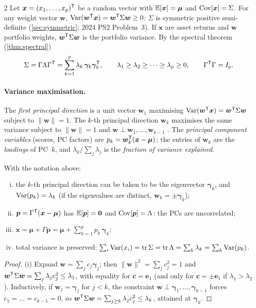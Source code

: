 \begin{paracol}{2}
Let $\bm x=(x_1,\dots,x_p)^{\mathsf T}$ be a random vector with $\mathbb{E}[\bm x]=\bm\mu$ and $\operatorname{Cov}[\bm x]=\Sigma$. For any
weight vector $\bm w$, $\operatorname{Var}(\bm w^{\mathsf T}\bm x)=\bm w^{\mathsf T}\Sigma\bm w\ge0$: $\Sigma$ is symmetric positive semi-definite
(\cref{sec:symmetric}; 2024 PS2 Problem~3). If $\bm x$ are asset returns and $\bm w$ portfolio weights,
$\bm w^{\mathsf T}\Sigma\bm w$ is the portfolio variance. By the spectral theorem (\cref{thm:spectral})
\[
  \Sigma=\Gamma\Lambda\Gamma^{\mathsf T}=\sum_{k=1}^p\lambda_k\,\bm\gamma_k\bm\gamma_k^{\mathsf T},\qquad
  \lambda_1\ge\lambda_2\ge\dots\ge\lambda_p\ge0,\qquad \Gamma^{\mathsf T}\Gamma=I_p .
\]

\paragraph{Variance maximisation.}

\begin{definition}\label{ch07:def-pca}
The \emph{first principal direction} is a unit vector $\bm w_1$ maximising $\operatorname{Var}(\bm w^{\mathsf T}\bm x)=\bm w^{\mathsf T}\Sigma\bm w$
subject to $\|\bm w\|=1$. The $k$-th principal direction $\bm w_k$ maximises the same variance subject to
$\|\bm w\|=1$ and $\bm w\perp\bm w_1,\dots,\bm w_{k-1}$ . The \emph{principal component
variables} (scores, PC factors) are $p_k=\bm w_k^{\mathsf T}(\bm x-\bm\mu)$; the entries of $\bm w_k$ are the
\emph{loadings} of PC~$k$, and $\lambda_k/\sum_j\lambda_j$ is the \emph{fraction of variance explained}.
\end{definition}

\begin{theorem}\label{ch07:thm-pca}
With the notation above:
\begin{enumerate}[(i)]
  \item the $k$-th principal direction can be taken to be the eigenvector $\bm\gamma_k$, and
        $\operatorname{Var}(p_k)=\lambda_k$ (if the eigenvalues are distinct, $\bm w_k=\pm\bm\gamma_k$);
  \item $\bm p=\Gamma^{\mathsf T}(\bm x-\bm\mu)$ has $\mathbb{E}[\bm p]=\bm 0$ and $\operatorname{Cov}[\bm p]=\Lambda$: the PCs are uncorrelated;
  \item $\bm x=\bm\mu+\Gamma\bm p=\bm\mu+\sum_{k=1}^p p_k\,\bm\gamma_k$;
  \item total variance is preserved: $\sum_i\operatorname{Var}(x_i)=\operatorname{tr}\Sigma=\operatorname{tr}\Lambda=\sum_k\lambda_k=\sum_k\operatorname{Var}(p_k)$.
\end{enumerate}
\end{theorem}
\begin{proof}
(i) Expand $\bm w=\sum_jc_j\bm\gamma_j$; then $\|\bm w\|^2=\sum_jc_j^2=1$ and $\bm w^{\mathsf T}\Sigma\bm w=\sum_j\lambda_jc_j^2\le\lambda_1$,
with equality for $\bm c=\bm e_1$ (and only for $\bm c=\pm\bm e_1$ if $\lambda_1>\lambda_2$). Inductively, if
$\bm w_j=\bm\gamma_j$ for $j<k$, the constraint $\bm w\perp\bm\gamma_1,\dots,\bm\gamma_{k-1}$ forces $c_1=\dots=c_{k-1}=0$, so
$\bm w^{\mathsf T}\Sigma\bm w=\sum_{j\ge k}\lambda_jc_j^2\le\lambda_k$, attained at $\bm\gamma_k$.


\end{proof}
\end{paracol}
